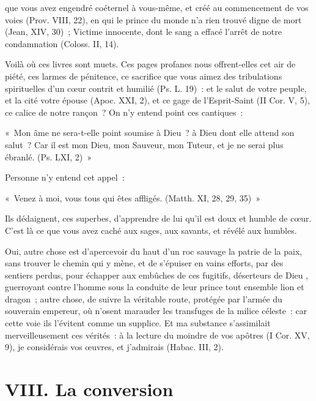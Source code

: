\documentclass[french,twoside]{book} %
\newenvironment{quoteblock}%
  {\begin{quoting}}
  {\end{quoting}}
\newcommand\chapteropen{} %
\newcommand\chapterclose{} %
\newenvironment{quotebar}{%
    \def\FrameCommand{{\color{rubric!10!}\vrule width 0.5em} \hspace{0.9em}}%
    \def\OuterFrameSep{\itemsep} %
    \MakeFramed {\advance\hsize-\width \FrameRestore}
  }%
  {%
    \endMakeFramed
  }
\renewenvironment{quoteblock}%
  {%
    \savenotes
    \setstretch{0.9}
    \normalfont
    \begin{quotebar}
  }
  {%
    \end{quotebar}
    \spewnotes
  }
\begin{document}
\noindent que vous avez engendré coéternel à vous-même, et créé au commencement de vos voies (Prov. VIII, 22), en qui le prince du monde n’a rien trouvé digne de mort (Jean, XIV, 30) ; Victime innocente, dont le sang a effacé l’arrêt de notre condamnation (Coloss. II, 14).\par
Voilà où ces livres sont muets. Ces pages profanes nous offrent-elles cet air de piété, ces larmes de pénitence, ce sacrifice que vous aimez des tribulations spirituelles d’un cœur contrit et humilié (Ps. L. 19) : et le salut de votre peuple, et la cité votre épouse (Apoc. XXI, 2), et ce gage de l’Esprit-Saint (II Cor. V, 5), ce calice de notre rançon ? On n’y entend point ces cantiques :\par

\begin{quoteblock}
\noindent « Mon âme ne sera-t-elle point soumise à Dieu ? à Dieu dont elle attend son salut ? Car il est mon Dieu, mon Sauveur, mon Tuteur, et je ne serai plus ébranlé. (Ps. LXI, 2) »\end{quoteblock}

\noindent Personne n’y entend cet appel :\par

\begin{quoteblock}
\noindent « Venez à moi, vous tous qui êtes affligés. (Matth. XI, 28, 29, 35) »\end{quoteblock}

\noindent Ils dédaignent, ces superbes, d’apprendre de lui qu’il est doux et humble de cœur. C’est là ce que vous avez caché aux sages, aux savants, et révélé aux humbles.\par
Oui, autre chose est d’apercevoir du haut d’un roc sauvage la patrie de la paix, sans trouver le chemin qui y mène, et de s’épuiser en vains efforts, par des sentiers perdus, pour échapper aux embûches de ces fugitifs, déserteurs de Dieu , guerroyant contre l’homme sous la conduite de leur prince tout ensemble lion et dragon ; autre chose, de suivre la véritable route, protégée par l’armée du souverain empereur, où n’osent marauder les transfuges de la milice céleste : car cette voie ils l’évitent comme un supplice. Et ma substance s’assimilait merveilleusement ces vérités : à la lecture du moindre de vos apôtres (I Cor. XV, 9), je considérais vos œuvres, et j’admirais (Habac. III, 2).
\chapterclose


\chapteropen
 \chapter[{VIII. La conversion}]{VIII. La conversion}
\label{VIII}\renewcommand{\leftmark}{VIII. La conversion}
\end{document}
